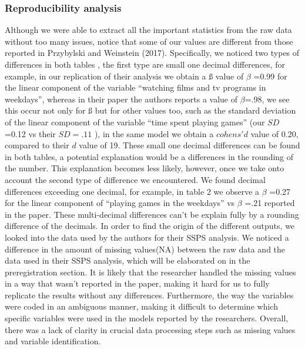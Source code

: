 \documentclass[floatsintext,man]{apa6}
\theoremstyle{definition}
\theoremstyle{definition}
\theoremstyle{definition}
\theoremstyle{remark}
\begin{document}
\hypertarget{reproducibility-analysis}{%
\subsubsection{Reproducibility
analysis}\label{reproducibility-analysis}}

Although we were able to extract all the important statistics from the
raw data without too many issues, notice that some of our values are
different from those reported in Przybylski and Weinstein (2017).
Specifically, we noticed two types of differences in both tables , the
first type are small one decimal differences, for example, in our
replication of their analysis we obtain a ß value of \(\beta\) =0.99 for
the linear component of the variable \enquote{watching films and tv
programs in weekdays}, whereas in their paper the authors reports a
value of \(\beta\)=.98, we see this occur not only for ß but for other
values too, such as the standard deviation of the linear component of
the variable \enquote{time spent playing games} (our \(SD\) =0.12 vs
their \(SD =.11\) ), in the same model we obtain a \(cohens'd\) value of
0.20, compared to their \(d\) value of 19. These small one decimal
differences can be found in both tables, a potential explanation would
be a differences in the rounding of the number. This explanation becomes
less likely, however, once we take onto account the second type of
difference we encountered. We found decimal differences exceeding one
decimal, for example, in table 2 we observe a \(\beta\) =0.27 for the
linear component of \enquote{playing games in the weekdays} vs \(\beta\)
=.21 reported in the paper. These multi-decimal differences can't be
explain fully by a rounding difference of the decimals. In order to find
the origin of the different outputs, we looked into the data used by the
authors for their SSPS analysis. We noticed a difference in the amount
of missing values(NA) between the raw data and the data used in their
SSPS analysis, which will be elaborated on in the preregistration
section. It is likely that the researcher handled the missing values in
a way that wasn't reported in the paper, making it hard for us to fully
replicate the results without any differences. Furthermore, the way the
variables were coded in an ambiguous manner, making it difficult to
determine which specific variables were used in the models reported by
the researchers. Overall, there was a lack of clarity in crucial data
processing steps such as missing values and variable identification.
\end{document}
